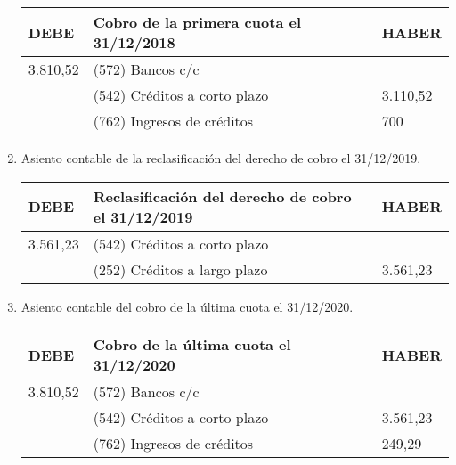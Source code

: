 \begin{enumerate}[label=\alph*)]
    \begin{table}[H]
        \centering
        \begin{tabular}{|p{3cm}|p{6cm}|p{3cm}|}
        \hline
        \rowcolor{blue!30}
        \textbf{DEBE} & \textbf{Cobro de la primera cuota el 31/12/2018} & \textbf{HABER} \\
        \hline
        3.810,52 & (572) Bancos c/c & \\
        \hline
        & (542) Créditos a corto plazo & 3.110,52 \\
        \hline
        & (762) Ingresos de créditos & 700 \\
        \hline
        \end{tabular}
    \end{table}
    \item Asiento contable de la reclasificación del derecho de cobro el 31/12/2019.
    \begin{table}[H]
        \centering
        \begin{tabular}{|p{3cm}|p{6cm}|p{3cm}|}
        \hline
        \rowcolor{blue!30}
        \textbf{DEBE} & \textbf{Reclasificación del derecho de cobro el 31/12/2019} & \textbf{HABER} \\
        \hline
        3.561,23 & (542) Créditos a corto plazo & \\
        \hline
        & (252) Créditos a largo plazo & 3.561,23 \\
        \hline
        \end{tabular}
    \end{table}
    \item Asiento contable del cobro de la última cuota el 31/12/2020.
    \begin{table}[H]
        \centering
        \begin{tabular}{|p{3cm}|p{6cm}|p{3cm}|}
        \hline
        \rowcolor{blue!30}
        \textbf{DEBE} & \textbf{Cobro de la última cuota el 31/12/2020} & \textbf{HABER} \\
        \hline
        3.810,52 & (572) Bancos c/c & \\
        \hline
        & (542) Créditos a corto plazo & 3.561,23 \\
        \hline
        & (762) Ingresos de créditos & 249,29 \\
        \hline
        \end{tabular}
    \end{table}
\end{enumerate}

